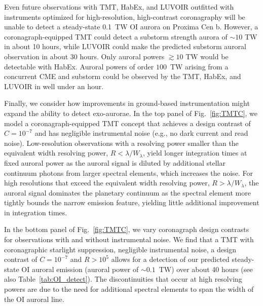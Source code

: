 \documentclass{emulateapj}
\begin{document}
Even future observations with TMT, HabEx, and LUVOIR outfitted with instruments optimized for high-resolution, high-contrast coronagraphy will be unable to detect a steady-state 0.1~TW OI aurora on Proxima Cen b. However, a coronagraph-equipped TMT could detect a substorm strength aurora of ${\sim} 10$ TW in about 10 hours, while LUVOIR could make the predicted substorm auroral observation in about 30 hours. Only auroral powers ${\gtrsim}10$ TW would be detectable with HabEx. %
Auroral powers of order $100$~TW arising from a concurrent CME and substorm could be observed by the TMT, HabEx, and LUVOIR in well under an hour.

Finally, we consider how improvements in ground-based instrumentation might expand the ability to detect exo-aurorae. In the top panel of Fig.~\ref{fig:TMTC}, we model a coronagraph-equipped TMT concept that achieves a design contrast of $C = 10^{-7}$ and has negligible instrumental noise (e.g., no dark current and read noise).  Low-resolution observations with a resolving power smaller than the equivalent width resolving power, $R < \lambda/W_\lambda$, yield longer integration times at fixed auroral power as the auroral signal is diluted by additional stellar continuum photons from larger spectral elements, which increases the noise.  For high resolutions that exceed the equivalent width resolving power, $R > \lambda/W_\lambda$, the auroral signal dominates the planetary continuum as the spectral element more tightly bounds the narrow emission feature, yielding little additional improvement in integration times.  %

In the bottom panel of Fig.~\ref{fig:TMTC}, we vary coronagraph design contrasts for observations with and without instrumental noise.  We find that a TMT with coronagraphic starlight suppression, negligible instrumental noise, a design contrast of $C = 10^{-7}$ and $R > 10^5$ allows for a detection of our predicted steady-state OI auroral emission (auroral power of ${\sim}0.1$~TW) over about 40 hours (see also Table~\ref{tab:OI_detect}). The discontinuities that occur at high resolving powers are due to the need for additional spectral elements to span the width of the OI auroral line.
\end{document}
